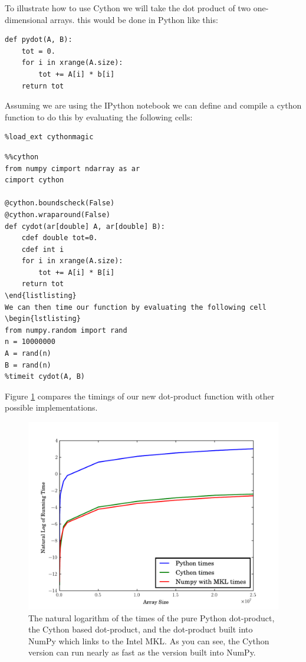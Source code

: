 To illustrate how to use Cython we will take the dot product of two one-dimensional arrays.
this would be done in Python like this:
\begin{lstlisting}
def pydot(A, B):
    tot = 0.
    for i in xrange(A.size):
        tot += A[i] * b[i]
    return tot
\end{lstlisting}
Assuming we are using the IPython notebook we can define and compile a cython function to do this by evaluating the following cells:

\begin{lstlisting}
%load_ext cythonmagic
\end{lstlisting}

\begin{lstlisting}
%%cython
from numpy cimport ndarray as ar
cimport cython

@cython.boundscheck(False)
@cython.wraparound(False)
def cydot(ar[double] A, ar[double] B):
    cdef double tot=0.
    cdef int i
    for i in xrange(A.size):
        tot += A[i] * B[i]
    return tot
\end{listlisting}
We can then time our function by evaluating the following cell
\begin{lstlisting}
from numpy.random import rand
n = 10000000
A = rand(n)
B = rand(n)
%timeit cydot(A, B)
\end{lstlisting}

Figure \ref{cython:dot} compares the timings of our new dot-product function with other possible implementations.

\begin{figure}
\includegraphics[width=\textwidth]{dot.pdf}
\caption{
The natural logarithm of the times of the pure Python dot-product, the Cython based dot-product, and the dot-product built into NumPy which links to the Intel MKL.
As you can see, the Cython version can run nearly as fast as the version built into NumPy.
}
\label{cython:dot}
\end{figure}

